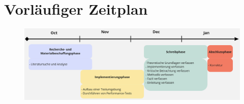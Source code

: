 \documentclass[a4paper, 12pt]{article}
\begin{document}
\section{Vorläufiger Zeitplan}
\begin{figure}[hbtp]
	\centering
	\includegraphics[scale=0.25]{img/Timeline Template.jpg}
\end{figure}



\end{document}
